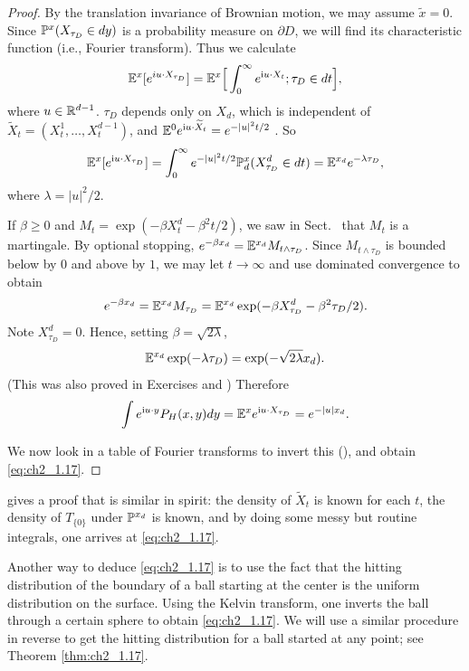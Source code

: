 \begin{proof}
By the translation invariance of Brownian motion, we may assume $\widetilde{x} = 0$. Since $\P^x(X_{\tau_D} \in dy)$ is a probability measure on $\partial D$, we will find its characteristic function (i.e., Fourier transform). Thus we calculate
\[
    \E^x[e^{iu\cdot X_{\tau_D}}] = \E^x\Big[\int_0^\infty e^{\im u\cdot X_t}; \tau_D \in dt\Big],
\]
where $u \in \R^{d-1}$. $\tau_D$ depends only on $X_d$, which is independent of $\widetilde{X}_t = (X_t^1,\ldots,X_t^{d-1})$, and $\E^0e^{\im u\cdot\widetilde{X}_t} = e^{-|u|^2t/2}$ . So
\[
    \E^x[e^{\im u\cdot X_{\tau_D}}] = \int_0^\infty e^{-|u|^2t/2}\P^x_d(X^d_{\tau_D} \in dt) = \E^{x_d}e^{-\lambda\tau_D},
\]
where $\lambda = |u|^2/2$.

If $\beta \geq 0$ and $M_t = \exp(-\beta X_t^d - \beta^2t/2)$, we saw in Sect.\  that $M_t$ is a martingale. By optional stopping, $e^{-\beta x_d} = \E^{x_d}M_{t\wedge\tau_D}$. Since $M_{t\wedge\tau_D}$ is bounded below by $0$ and above by $1$, we may let $t \to \infty$ and use dominated convergence to obtain
\[
    e^{-\beta x_d} = \E^{x_d}M_{\tau_D} = \E^{x_d}\exp(-\beta X^d_{\tau_D} - \beta^2\tau_D/2).
\]
Note $X^d_{\tau_D} = 0$. Hence, setting $\beta = \sqrt{2\lambda}$,
\[
    \E^{x_d}\exp(-\lambda\tau_D) = \exp(-\sqrt{2\lambda}x_d).
\]
(This was also proved in Exercises  and ) Therefore
\[
    \int e^{\im u\cdot y}P_H(x,y)dy = \E^x e^{\im u\cdot X_{\tau_D}} = e^{-|u|x_d}.
\]

We now look in a table of Fourier transforms to invert this (\cite[see][]{Erdelyi1954}), and obtain \eqref{eq:ch2_1.17}.
\end{proof}


\cite{Durrett1984} gives a proof that is similar in spirit: the density of $\widetilde{X}_t$ is known for each $t$, the density of $T_{\{0\}}$ under $\P^{x_d}$ is known, and by doing some messy but routine integrals, one arrives at \eqref{eq:ch2_1.17}.


Another way to deduce \eqref{eq:ch2_1.17} is to use the fact that the hitting distribution of the boundary of a ball starting at the center is the uniform distribution on the surface. Using the Kelvin transform, one inverts the ball through a certain sphere to obtain \eqref{eq:ch2_1.17}. We will use a similar procedure in reverse to get the hitting distribution for a ball started at any point; see Theorem \ref{thm:ch2_1.17}.

